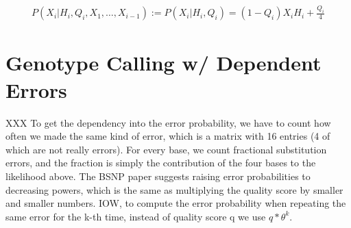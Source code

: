 \documentclass{article}
\begin{document}
\begin{align*}
P(X_i|H_i,Q_i,X_1,\ldots,X_{i-1}) := P(X_i|H_i,Q_i) = (1-Q_i) X_i H_i + \frac{Q_i}{4}
\end{align*}


\section{Genotype Calling w/ Dependent Errors}



XXX To get the dependency into the error probability, we have to count
how often we made the same kind of error, which is a matrix with 16
entries (4 of which are not really errors).  For every base, we count
fractional substitution errors, and the fraction is simply the
contribution of the four bases to the likelihood above.  The BSNP
paper suggests raising error probabilities to decreasing powers,
which is the same as multiplying the quality score by smaller and
smaller numbers.  IOW, to compute the error probability when
repeating the same error for the k-th time, instead of quality score
q we use $q * \theta^k$.
\end{document}
